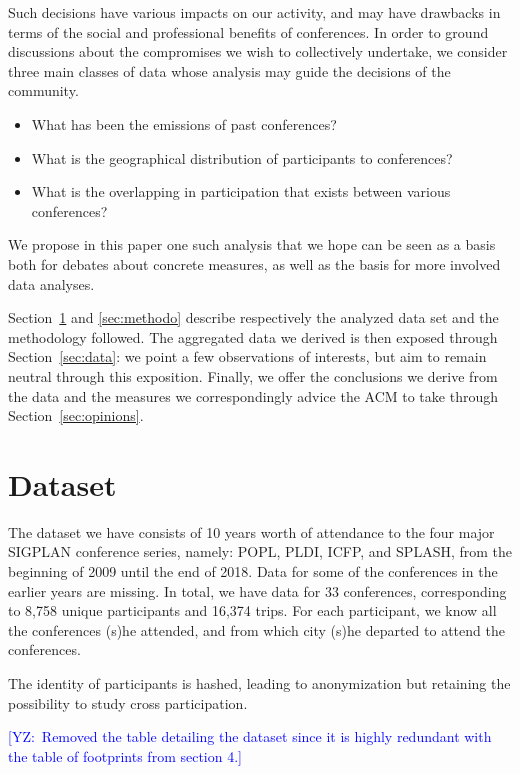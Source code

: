 \documentclass[manuscript, review, screen]{acmart}
\newcommand{\yz}[1]{\textcolor{blue}{{[YZ:~#1]}}}
\newcommand{\yz}[1]{}
\begin{document}
Such decisions have various impacts on our activity, and may have drawbacks in
terms of the social and professional benefits of conferences. 
In order to ground discussions about the compromises we wish to collectively undertake, we consider
three main classes of data whose analysis may guide the decisions of the community.
\begin{itemize}
\item What has been the emissions of past conferences?
\item What is the geographical distribution of participants to conferences?
\item What is the overlapping in participation that exists between various conferences?
\end{itemize}

We propose in this paper one such analysis that we hope can be seen as a basis both for
debates about concrete measures, as well as the basis for more involved data analyses.

Section~\ref{sec:dataset} and \ref{sec:methodo} describe respectively the
analyzed data set and the methodology followed. The aggregated data
we derived is then exposed through Section~\ref{sec:data}: we point a few
observations of interests, but aim to remain neutral through this exposition.
Finally, we offer the conclusions we derive from the data and the measures we
correspondingly advice the ACM to take through Section~\ref{sec:opinions}.

\section{Dataset}
\label{sec:dataset}
 
The dataset we have consists of 10 years worth of attendance to the four major
SIGPLAN conference series, namely: POPL, PLDI, ICFP, and SPLASH, from the
beginning of 2009 until the end of 2018. Data for some of the conferences in the
earlier years are missing. In total, we have data for 33 conferences,
corresponding to 8,758 unique participants and 16,374 trips. For each
participant, we know all the conferences (s)he attended, and from which city
(s)he departed to attend the conferences.

The identity of participants is hashed, leading to anonymization but retaining
the possibility to study cross participation.

\yz{Removed the table detailing  the dataset since it is highly redundant with the table of footprints from section 4.}
\end{document}

